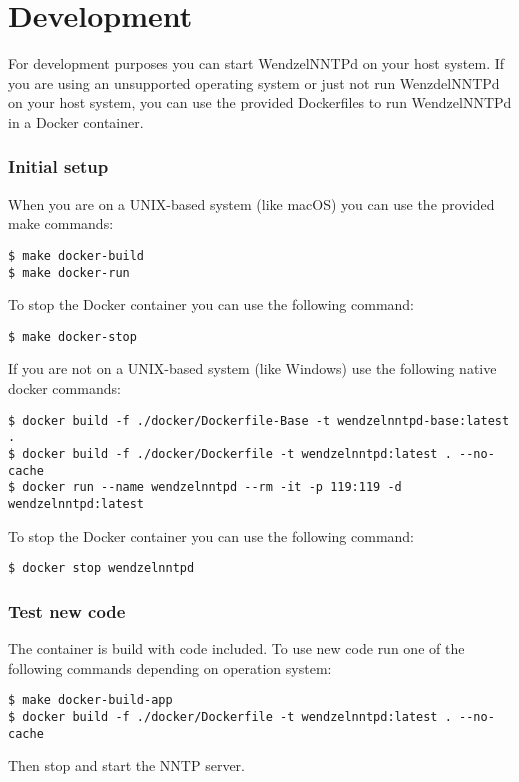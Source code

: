 \chapter{Development}

For development purposes you can start WendzelNNTPd on your host system. If you are using an unsupported operating system or just not run WenzdelNNTPd on your host system, you can use the provided Dockerfiles to run WendzelNNTPd in a Docker container.

\subsection{Initial setup}
When you are on a UNIX-based system (like macOS) you can use the provided make commands:
\begin{verbatim}
$ make docker-build
$ make docker-run
\end{verbatim}
To stop the Docker container you can use the following command:
\begin{verbatim}
$ make docker-stop
\end{verbatim}
If you are not on a UNIX-based system (like Windows) use the following native docker commands:
\begin{verbatim}
$ docker build -f ./docker/Dockerfile-Base -t wendzelnntpd-base:latest .
$ docker build -f ./docker/Dockerfile -t wendzelnntpd:latest . --no-cache
$ docker run --name wendzelnntpd --rm -it -p 119:119 -d wendzelnntpd:latest
\end{verbatim}
To stop the Docker container you can use the following command:
\begin{verbatim}
$ docker stop wendzelnntpd
\end{verbatim}

\subsection{Test new code}
The container is build with code included. To use new code run one of the following commands depending on operation system:
\begin{verbatim}
$ make docker-build-app
$ docker build -f ./docker/Dockerfile -t wendzelnntpd:latest . --no-cache
\end{verbatim}
Then stop and start the NNTP server.
